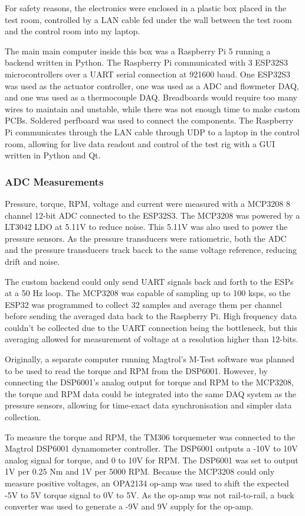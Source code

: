 For safety reasons, the electronics were enclosed in a plastic box placed in the test room, controlled by a LAN cable fed under the wall between the test room and the control room into my laptop.

The main main computer inside this box was a Raspberry Pi 5 running a backend written in Python. The Raspberry Pi communicated with 3 ESP32S3 microcontrollers over a UART serial connection at 921600 baud. One ESP32S3 was used as the actuator controller, one was used as a ADC and flowmeter DAQ, and one was used as a thermocouple DAQ. Breadboards would require too many wires to maintain and unstable, while there was not enough time to make custom PCBs. Soldered perfboard was used to connect the components. The Raspberry Pi communicates through the LAN cable through UDP to a laptop in the control room, allowing for live data readout and control of the test rig with a GUI written in Python and Qt.

\subsubsection{ADC Measurements}

Pressure, torque, RPM, voltage and current were measured with a MCP3208 8 channel 12-bit ADC connected to the ESP32S3. The MCP3208 was powered by a LT3042 LDO at 5.11V to reduce noise. This 5.11V was also used to power the pressure sensors. As the pressure transducers were ratiometric, both the ADC and the pressure transducers track bacck to the same voltage reference, reducing drift and noise.

The custom backend could only send UART signals back and forth to the ESPs at a 50 Hz loop. The MCP3208 was capable of sampling up to 100 ksps, so the ESP32 was programmed to collect 32 samples and average them per channel before sending the averaged data back to the Raspberry Pi. High frequency data couldn't be collected due to the UART connection being the bottleneck, but this averaging allowed for measurement of voltage at a resolution higher than 12-bits.

Originally, a separate computer running Magtrol's M-Test software was planned to be used to read the torque and RPM from the DSP6001. However, by connecting the DSP6001's analog output for torque and RPM to the MCP3208, the torque and RPM data could be integrated into the same DAQ system as the pressure sensors, allowing for time-exact data synchronisation and simpler data collection.

To measure the torque and RPM, the TM306 torquemeter was connected to the Magtrol DSP6001 dynamometer controller. The DSP6001 outputs a -10V to 10V analog signal for torque, and 0 to 10V for RPM. The DSP6001 was set to output 1V per 0.25 Nm and 1V per 5000 RPM. Because the MCP3208 could only measure positive voltages, an OPA2134 op-amp was used to shift the expected -5V to 5V torque signal to 0V to 5V. As the op-amp was not rail-to-rail, a buck converter was used to generate a -9V and 9V supply for the op-amp.

